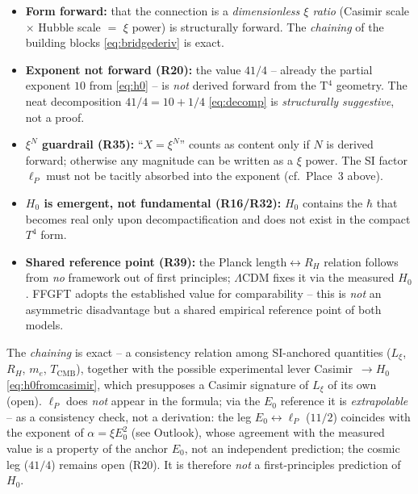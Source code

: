 \begin{warningboxenv}
\begin{itemize}
  \item \textbf{Form forward:} that the connection is a \emph{dimensionless
        $\xi$ ratio} (Casimir scale $\times$ Hubble scale $=$ $\xi$ power) is
        structurally forward. The \emph{chaining} of the building blocks
        \eqref{eq:bridgederiv} is exact.
  \item \textbf{Exponent not forward (R20):} the value $41/4$ -- already the
        partial exponent $10$ from \eqref{eq:h0} -- is \emph{not} derived
        forward from the T$^4$ geometry. The neat decomposition $41/4=10+1/4$
        \eqref{eq:decomp} is \emph{structurally suggestive}, not a proof.
  \item \textbf{$\xi^N$ guardrail (R35):} ``$X=\xi^N$'' counts as content only
        if $N$ is derived forward; otherwise any magnitude can be written as a
        $\xi$ power. The SI factor $\ell_P$ must not be tacitly absorbed into
        the exponent (cf.\ Place~3 above).
  \item \textbf{$H_0$ is emergent, not fundamental (R16/R32):} $H_0$ contains
        the $\hbar$ that becomes real only upon decompactification and does not
        exist in the compact $T^4$ form.
  \item \textbf{Shared reference point (R39):} the Planck length$\leftrightarrow
        R_H$ relation follows from \emph{no} framework out of first principles;
        $\Lambda$CDM fixes it via the measured $H_0$. FFGFT adopts the
        established value for comparability -- this is \emph{not} an asymmetric
        disadvantage but a shared empirical reference point of both models.
\end{itemize}
\end{warningboxenv}

\begin{foundation}
The \emph{chaining} is exact -- a consistency relation among SI-anchored
quantities ($L_\xi$, $R_H$, $m_e$, $T_\text{CMB}$), together with the possible
experimental lever Casimir~$\to H_0$ \eqref{eq:h0fromcasimir}, which presupposes
a Casimir signature of $L_\xi$ of its own (open). $\ell_P$ does
\emph{not} appear in the formula; via the $E_0$ reference it is
\emph{extrapolable} -- as a consistency check, not a derivation: the leg
$E_0\leftrightarrow\ell_P$ ($11/2$) coincides with the exponent of
$\alpha=\xi E_0^2$ (see Outlook), whose agreement with the measured value is a
property of the anchor $E_0$, not an independent prediction; the cosmic leg
($41/4$) remains open (R20). It is therefore
\emph{not} a first-principles prediction of $H_0$.
\end{foundation}

